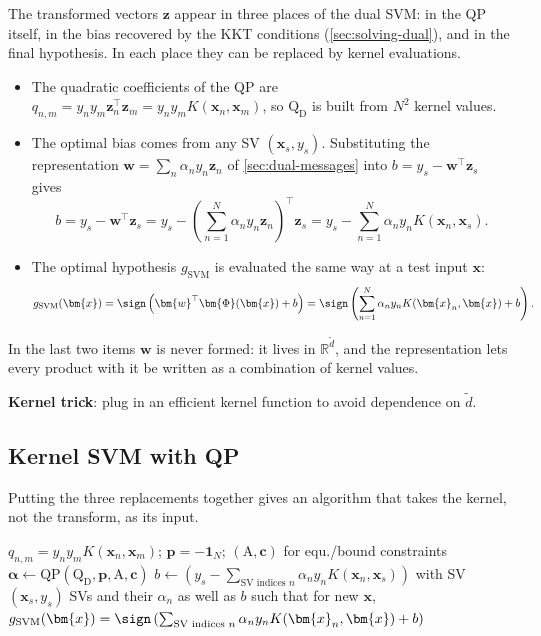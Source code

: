 The transformed vectors \(\bm{z}\) appear in three places of the dual SVM:
in the QP itself, in the bias recovered by the KKT conditions
(\autoref{sec:solving-dual}), and in the final hypothesis. In each place they
can be replaced by kernel evaluations.
\begin{itemize}
    \item The quadratic coefficients of the QP are \(q_{n,m} = y_n y_m
        \bm{z}_n^\top \bm{z}_m = y_n y_m K(\bm{x}_n, \bm{x}_m)\), so
        \(\mathrm{Q}_{\mathrm{D}}\) is built from \(N^2\) kernel values.
    \item The optimal bias comes from any SV \((\bm{x}_s, y_s)\). Substituting
        the representation \(\bm{w} = \sum_n \alpha_n y_n \bm{z}_n\) of
        \autoref{sec:dual-messages} into \(b = y_s - \bm{w}^\top \bm{z}_s\)
        gives
        \[
            b = y_s - \bm{w}^\top \bm{z}_s = y_s - \left( \sum_{n=1}^N
            \alpha_n y_n \bm{z}_n \right)^\top \bm{z}_s = y_s - \sum_{n=1}^N
            \alpha_n y_n K(\bm{x}_n, \bm{x}_s).
        \]
    \item The optimal hypothesis \(g_{\mathrm{SVM}}\) is evaluated the same
        way at a test input \(\bm{x}\):
        \[
            g_{\mathrm{SVM}}(\bm{x}) = \sign \left( \bm{w}^\top
            \bm{\Phi}(\bm{x}) + b \right) = \sign \left( \sum_{n=1}^N
            \alpha_n y_n K(\bm{x}_n, \bm{x}) + b \right).
        \]
\end{itemize}
In the last two items \(\bm{w}\) is never formed: it lives in
\(\mathbb{R}^{\tilde{d}}\), and the representation lets every product with
it be written as a combination of kernel values.

\begin{moral}
    \textbf{Kernel trick}: plug in an efficient kernel function to avoid
    dependence on \(\tilde{d}\).
\end{moral}

\subsection{Kernel SVM with QP}

Putting the three replacements together gives an algorithm that takes the
kernel, not the transform, as its input.

\begin{algorithm}[H]
    \caption{Kernel Hard-Margin SVM}\label{alg:kernel-hard-svm}
    \(q_{n,m} = y_n y_m K(\bm{x}_n, \bm{x}_m)\); \(\bm{p} = -\bm{1}_N\);
        \((\mathrm{A}, \bm{c})\) for equ./bound constraints\;
    \(\bm{\alpha} \gets \mathrm{QP}(\mathrm{Q}_{\mathrm{D}}, \bm{p},
        \mathrm{A}, \bm{c})\)\;
    \(b \gets \left( y_s - \sum_{\text{SV indices } n} \alpha_n y_n
        K(\bm{x}_n, \bm{x}_s) \right)\) with SV \((\bm{x}_s, y_s)\)\;
    \Return SVs and their \(\alpha_n\) as well as \(b\) such that for new
        \(\bm{x}\),
        \(g_{\mathrm{SVM}}(\bm{x}) = \sign \left( \sum_{\text{SV indices } n}
        \alpha_n y_n K(\bm{x}_n, \bm{x}) + b \right)\)\;
\end{algorithm}

